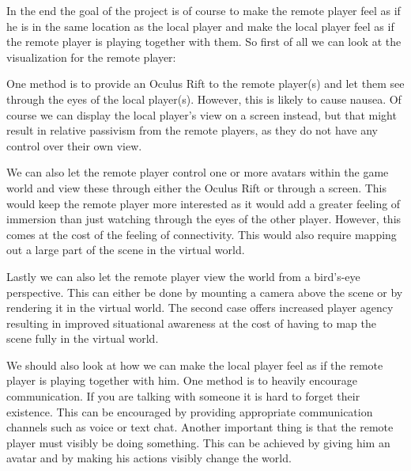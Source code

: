 	In the end the goal of the project is of course to make the remote player feel
	as if he is in the same location as the local player and make the local player
	feel as if the remote player is playing together with them. So first of all we can look at the visualization for the remote player:

	One method is to provide an Oculus Rift to the remote player(s) and let them
	see through the eyes of the local player(s). However, this is likely to cause
	nausea. Of course we can display the local player's view on a screen instead,
	but that might result in relative passivism from the remote players, as they
	do not have any control over their own view.

	We can also let the remote player control one or more avatars within the game
	world and view these through either the Oculus Rift or through a screen. This
	would keep the remote player more interested as it would add a greater feeling of immersion than just watching through the eyes of the other player. However, this comes at the cost of the feeling of connectivity. This would also require
	mapping out a large part of the scene in the virtual world.

	Lastly we can also let the remote player view the world from a bird's-eye
	perspective. This can either be done by mounting a camera above the scene or
	by rendering it in the virtual world. The second case offers increased player
	agency resulting in improved situational awareness at the cost of having
	to map the scene fully in the virtual world.

	We should also look at how we can make the local player feel as if the remote
	player is playing together with him. One method is to heavily encourage communication. If you are talking with someone it is hard to forget their existence. This can be encouraged by providing appropriate communication channels such as voice or text chat. Another important thing is that the remote player must visibly be doing something. This can be achieved by giving him an avatar and by making his actions visibly change the world.